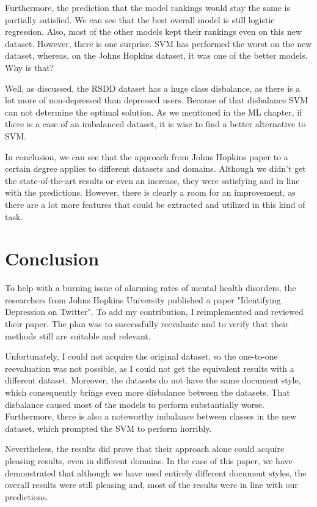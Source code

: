\documentclass[times, utf8, seminar]{fer}
\begin{document}
Furthermore, the prediction that the model rankings would stay the same is partially satisfied. We can see that the best overall model is still logistic regression. Also, most of the other models kept their rankings even on this new dataset. However, there is one surprise. SVM has performed the worst on the new dataset, whereas, on the Johns Hopkins dataset, it was one of the better models. Why is that? 

Well, as discussed, the RSDD dataset has a huge class disbalance, as there is a lot more of non-depressed than depressed users. Because of that disbalance SVM can not determine the optimal solution. As we mentioned in the ML chapter, if there is a case of an imbalanced dataset, it is wise to find a better alternative to SVM.

In conclusion, we can see that the approach from Johns Hopkins paper to a certain degree applies to different datasets and domains. Although we didn't get the state-of-the-art results or even an increase, they were satisfying and in line with the predictions. However, there is clearly a room for an improvement, as there are a lot more features that could be extracted and utilized in this kind of task. 

\chapter{Conclusion}

To help with a burning issue of alarming rates of mental health disorders, the researchers from Johns Hopkins University published a paper "Identifying Depression on Twitter". To add my contribution, I  reimplemented and reviewed their paper. The plan was to successfully reevaluate and to verify that their methods still are suitable and relevant.

Unfortunately, I could not acquire the original dataset, so the one-to-one reevaluation was not possible, as I could not get the equivalent results with a different dataset. Moreover, the datasets do not have the same document style, which consequently brings even more disbalance between the datasets. That disbalance caused most of the models to perform substantially worse. Furthermore, there is also a noteworthy imbalance between classes in the new dataset, which prompted the SVM to perform horribly.

Nevertheless, the results did prove that their approach alone could acquire pleasing results, even in different domains. In the case of this paper, we have demonstrated that although we have used entirely different document styles, the overall results were still pleasing and, most of the results were in line with our predictions.





\end{document}
